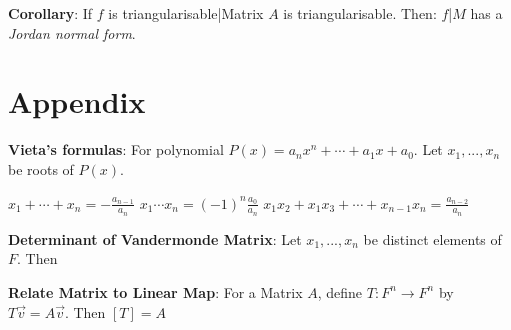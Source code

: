 \documentclass[9pt]{article}
\begin{document}
\quad \textbf{Corollary}: If $f$ is triangularisable|Matrix $A$ is triangularisable. \quad Then: $f$|$M$ has a \textit{Jordan normal form}.


\section{Appendix} %

\textbf{Vieta's formulas}: For polynomial $P(x)=a_nx^n+\cdots+a_1x+a_0$. \quad Let $x_1,...,x_n$ be roots of $P(x)$.

\qquad  $x_1+\cdots+x_n=-\frac{a_{n-1}}{a_n}$ \quad $x_1\cdots x_n=(-1)^n\frac{a_0}{a_n}$ \quad $x_1x_2+x_1x_3+\cdots+x_{n-1}x_n=\frac{a_{n-2}}{a_n}$

\vspace{-13pt}
\textbf{Determinant of Vandermonde Matrix}: Let $x_1,...,x_n$ be distinct elements of $F$. \quad Then 
\vspace{-13pt}

\textbf{Relate Matrix to Linear Map}: For a Matrix $A$, define $T:F^n\to F^n$ by $T\vec{v}=A\vec{v}$. Then $[T]=A$
\end{document}
